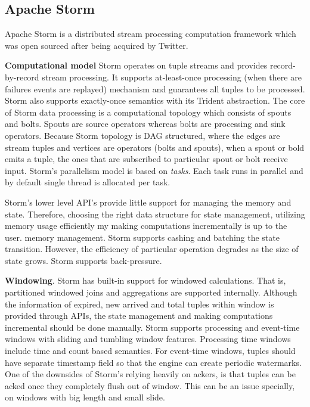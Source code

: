 \documentclass{vldb}
\begin{document}
\subsection{Apache Storm}

Apache Storm is a distributed stream processing computation framework which was open sourced after being acquired by Twitter. 


\textbf{Computational model}
Storm operates on tuple streams and provides record-by-record stream processing. It supports at-least-once processing (when there are failures events are replayed) mechanism and guarantees all tuples to be processed. Storm also supports exactly-once semantics with its Trident abstraction. The core of Storm data processing is a computational topology which consists of spouts and bolts.  Spouts are source operators whereas bolts are processing and sink operators. Because Storm topology is DAG structured, where the edges are stream tuples and vertices are operators (bolts and spouts), when a spout or bold emits a tuple, the ones that are subscribed to particular spout or bolt receive input. Storm's parallelism model is based on \textit{tasks}. Each task runs in parallel and by default single thread is allocated per task. 

Storm's lower level API's provide little support for managing the memory and state. Therefore, choosing the right data structure for state management, utilizing memory usage efficiently my making computations incrementally  is up to the user. 
memory management. Storm supports cashing and batching the state transition. However, the efficiency of particular operation degrades as the size of state grows.  Storm  supports back-pressure.



\textbf{Windowing}.
Storm has built-in support for windowed calculations. That is, partitioned windowed joins and aggregations are supported internally.  Although the information of expired, new arrived and total tuples within window is provided through APIs, the state management and making computations incremental  should be done manually. Storm supports processing and event-time windows with sliding and tumbling window features. Processing time windows include time and count based semantics. For event-time windows, tuples should have separate timestamp field so that the engine can create periodic watermarks. One of the downsides of Storm's relying heavily on ackers, is that tuples can be acked once they completely flush out of window. This can be an issue specially, on windows with big length and small slide.  
\end{document}
